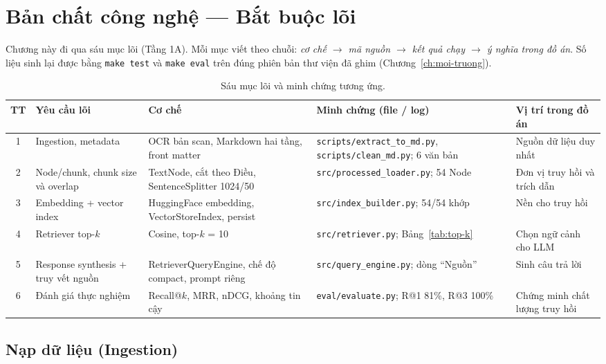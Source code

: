 \chapter{Bản chất công nghệ --- Bắt buộc lõi}
\label{ch:cong-nghe-cot-loi}

Chương này đi qua sáu mục lõi (Tầng 1A). Mỗi mục viết theo chuỗi: \emph{cơ chế $\rightarrow$ mã nguồn
$\rightarrow$ kết quả chạy $\rightarrow$ ý nghĩa trong đồ án}. Số liệu sinh lại được bằng \texttt{make test}
và \texttt{make eval} trên đúng phiên bản thư viện đã ghim (Chương~\ref{ch:moi-truong}).

\begin{table}[H]
  \centering
  \footnotesize
  \begin{tabularx}{\textwidth}{c >{\hsize=0.85\hsize}X >{\hsize=1.05\hsize}X >{\hsize=1.2\hsize}X >{\hsize=0.9\hsize}X}
    \toprule
    \textbf{TT} & \textbf{Yêu cầu lõi} & \textbf{Cơ chế} & \textbf{Minh chứng (file / log)} & \textbf{Vị trí trong đồ án} \\
    \midrule
    1 & Ingestion, metadata & OCR bản scan, Markdown hai tầng, front matter & \texttt{scripts/extract\_to\_md.py}, \texttt{scripts/clean\_md.py}; 6 văn bản & Nguồn dữ liệu duy nhất \\
    2 & Node/chunk, chunk size và overlap & TextNode, cắt theo Điều, SentenceSplitter 1024/50 & \texttt{src/processed\_loader.py}; 54 Node & Đơn vị truy hồi và trích dẫn \\
    3 & Embedding + vector index & HuggingFace embedding, VectorStoreIndex, persist & \texttt{src/index\_builder.py}; 54/54 khớp & Nền cho truy hồi \\
    4 & Retriever top-$k$ & Cosine, top-$k$ = 10 & \texttt{src/retriever.py}; Bảng~\ref{tab:top-k} & Chọn ngữ cảnh cho LLM \\
    5 & Response synthesis + truy vết nguồn & RetrieverQueryEngine, chế độ compact, prompt riêng & \texttt{src/query\_engine.py}; dòng ``Nguồn'' & Sinh câu trả lời \\
    6 & Đánh giá thực nghiệm & Recall@$k$, MRR, nDCG, khoảng tin cậy & \texttt{eval/evaluate.py}; R@1 81\%, R@3 100\% & Chứng minh chất lượng truy hồi \\
    \bottomrule
  \end{tabularx}
  \caption{Sáu mục lõi và minh chứng tương ứng.}
  \label{tab:tong-hop-1a}
\end{table}

\section{Nạp dữ liệu (Ingestion)}
\label{sec:ingestion}

